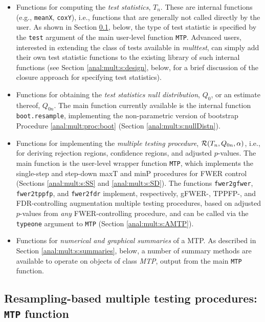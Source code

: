 \documentclass[11pt]{article}
\newcommand{\Rpackage}[1]{\textit{#1}}
\newcommand{\Robject}[1]{\texttt{#1}}
\newcommand{\Rclass}[1]{\textit{#1}}
\begin{document}
\begin{itemize}

\item 
Functions for computing the {\em test statistics}, $T_n$. These are internal functions (e.g., \Robject{meanX}, \Robject{coxY}), i.e., functions that are generally not called directly by the user. 
As shown in Section \ref{anal:mult:s:MTP}, below, the type of test statistic is specified by the \Robject{test} argument of the main user-level function \Robject{MTP}.  
Advanced users, interested in extending the class of tests available in \Rpackage{multtest}, can simply add their own test statistic functions to the existing library of such internal functions (see Section \ref{anal:mult:s:design}, below, for a brief discussion of the closure approach for specifying test statistics).

\item
Functions for obtaining the {\em test statistics null distribution}, $Q_0$, or an estimate thereof, $Q_{0n}$.  The main function currently available is the internal function \Robject{boot.resample}, implementing the non-parametric version of bootstrap Procedure \ref{anal:mult:proc:boot} (Section \ref{anal:mult:s:nullDistn}). 

\item
Functions for implementing the {\em multiple testing procedure}, ${\cal R}(T_n, Q_{0n},\alpha)$, i.e., for deriving rejection regions, confidence regions, and adjusted $p$-values. 
The main function is the  user-level wrapper function \Robject{MTP}, which implements the single-step and step-down maxT and minP procedures for FWER control (Sections \ref{anal:mult:s:SS} and \ref{anal:mult:s:SD}). 
The functions \Robject{fwer2gfwer}, \Robject{fwer2tppfp}, and \Robject{fwer2fdr} implement, respectively, gFWER-, TPPFP-, and FDR-controlling augmentation multiple testing procedures, based on adjusted $p$-values from {\em any} FWER-controlling procedure, and can be called via the \Robject{typeone} argument to \Robject{MTP} (Section \ref{anal:mult:s:AMTP}). 

\item
Functions for {\em numerical and graphical summaries} of a MTP. As described in Section \ref{anal:mult:s:summaries}, below, a number of summary methods are available to operate on objects of class \Rclass{MTP}, output from the main \Robject{MTP} function.
\end{itemize}

\subsection{Resampling-based multiple testing procedures: \Robject{MTP} function}
\label{anal:mult:s:MTP}
\end{document}
